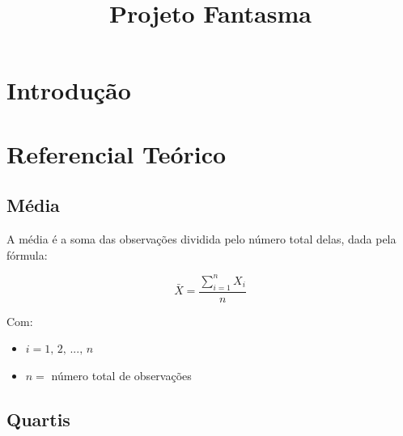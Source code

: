 \documentclass[
]{estat/estat}
\title{Projeto Fantasma}
\author{}
\date{}
\let\oldsection\section
\renewcommand\section{\clearpage\oldsection}
\renewcommand*\contentsname{Índice}
\newcommand\contentsname{Índice}
\begin{document}
\maketitle

\fancyhf{} 

\fancyhead[L]{} %
\renewcommand{\headrulewidth}{0pt}   %

\fancyfoot[R]{\textcolor{white}{\thepage}} %

\pagestyle{fancy} 



\renewcommand*\contentsname{Sumário}
{
\hypersetup{linkcolor=}
\setcounter{tocdepth}{3}
\tableofcontents
}

\section{Introdução}\label{introduuxe7uxe3o}

\section{Referencial Teórico}\label{referencial-teuxf3rico}

\subsection{Média}\label{muxe9dia}

A média é a soma das observações dividida pelo número total delas, dada
pela fórmula:

\[\bar{X}=\frac{\sum\limits_{i=1}^{n}X_i}{n}\]

Com:

\begin{itemize}
\item
  \(i = 1, \, 2, \, ..., \, n\)
\item
  \(n =\) número total de observações
\end{itemize}

\subsection{Quartis}\label{quartis}
\end{document}
